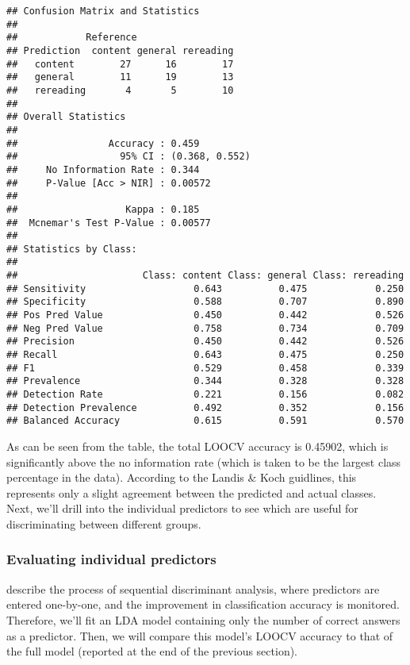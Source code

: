 \documentclass[12pt,]{article}
\begin{document}
\begin{verbatim}
## Confusion Matrix and Statistics
## 
##            Reference
## Prediction  content general rereading
##   content        27      16        17
##   general        11      19        13
##   rereading       4       5        10
## 
## Overall Statistics
##                                         
##                Accuracy : 0.459         
##                  95% CI : (0.368, 0.552)
##     No Information Rate : 0.344         
##     P-Value [Acc > NIR] : 0.00572       
##                                         
##                   Kappa : 0.185         
##  Mcnemar's Test P-Value : 0.00577       
## 
## Statistics by Class:
## 
##                      Class: content Class: general Class: rereading
## Sensitivity                   0.643          0.475            0.250
## Specificity                   0.588          0.707            0.890
## Pos Pred Value                0.450          0.442            0.526
## Neg Pred Value                0.758          0.734            0.709
## Precision                     0.450          0.442            0.526
## Recall                        0.643          0.475            0.250
## F1                            0.529          0.458            0.339
## Prevalence                    0.344          0.328            0.328
## Detection Rate                0.221          0.156            0.082
## Detection Prevalence          0.492          0.352            0.156
## Balanced Accuracy             0.615          0.591            0.570
\end{verbatim}

As can be seen from the table, the total LOOCV accuracy is 0.45902,
which is significantly above the no information rate (which is taken to
be the largest class percentage in the data). According to the Landis \&
Koch \citep[1977; as reported in][]{salkind_encyclopedia_2007}
guidlines, this represents only a slight agreement between the predicted
and actual classes. Next, we'll drill into the individual predictors to
see which are useful for discriminating between different groups.

\hypertarget{evaluating-individual-predictors}{%
\subsubsection{Evaluating individual
predictors}\label{evaluating-individual-predictors}}

\citet{tabachnick_using_2012} describe the process of sequential
discriminant analysis, where predictors are entered one-by-one, and the
improvement in classification accuracy is monitored. Therefore, we'll
fit an LDA model containing only the number of correct answers as a
predictor. Then, we will compare this model's LOOCV accuracy to that of
the full model (reported at the end of the previous section).
\end{document}
